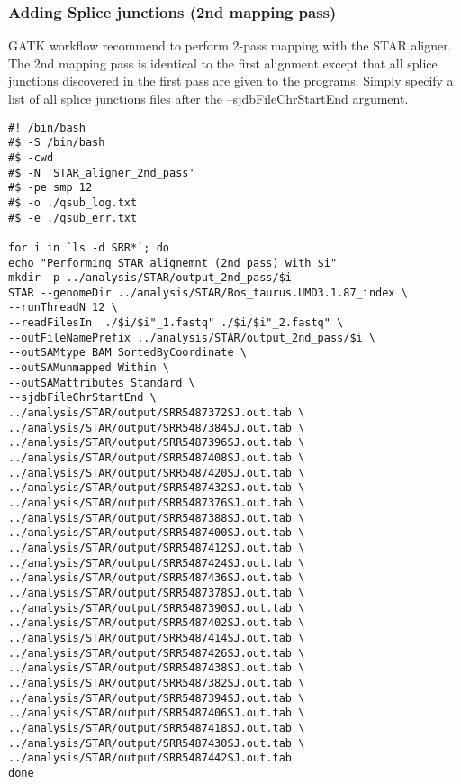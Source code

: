 \subsubsection{Adding Splice junctions (2nd mapping pass)}

GATK workflow recommend to perform 2-pass mapping with the STAR aligner. The 2nd mapping pass is identical to the first alignment except that all splice junctions discovered in the first pass are given to the programs. Simply specify a list of all splice junctions files after the --sjdbFileChrStartEnd argument.


\begin{verbatim}
#! /bin/bash
#$ -S /bin/bash
#$ -cwd
#$ -N 'STAR_aligner_2nd_pass'
#$ -pe smp 12
#$ -o ./qsub_log.txt
#$ -e ./qsub_err.txt

for i in `ls -d SRR*`; do	
echo "Performing STAR alignemnt (2nd pass) with $i"
mkdir -p ../analysis/STAR/output_2nd_pass/$i
STAR --genomeDir ../analysis/STAR/Bos_taurus.UMD3.1.87_index \
--runThreadN 12 \
--readFilesIn  ./$i/$i"_1.fastq" ./$i/$i"_2.fastq" \
--outFileNamePrefix ../analysis/STAR/output_2nd_pass/$i \
--outSAMtype BAM SortedByCoordinate \
--outSAMunmapped Within \
--outSAMattributes Standard \
--sjdbFileChrStartEnd \
../analysis/STAR/output/SRR5487372SJ.out.tab \
../analysis/STAR/output/SRR5487384SJ.out.tab \
../analysis/STAR/output/SRR5487396SJ.out.tab \
../analysis/STAR/output/SRR5487408SJ.out.tab \
../analysis/STAR/output/SRR5487420SJ.out.tab \
../analysis/STAR/output/SRR5487432SJ.out.tab \
../analysis/STAR/output/SRR5487376SJ.out.tab \
../analysis/STAR/output/SRR5487388SJ.out.tab \
../analysis/STAR/output/SRR5487400SJ.out.tab \
../analysis/STAR/output/SRR5487412SJ.out.tab \
../analysis/STAR/output/SRR5487424SJ.out.tab \
../analysis/STAR/output/SRR5487436SJ.out.tab \
../analysis/STAR/output/SRR5487378SJ.out.tab \
../analysis/STAR/output/SRR5487390SJ.out.tab \
../analysis/STAR/output/SRR5487402SJ.out.tab \
../analysis/STAR/output/SRR5487414SJ.out.tab \
../analysis/STAR/output/SRR5487426SJ.out.tab \
../analysis/STAR/output/SRR5487438SJ.out.tab \
../analysis/STAR/output/SRR5487382SJ.out.tab \
../analysis/STAR/output/SRR5487394SJ.out.tab \
../analysis/STAR/output/SRR5487406SJ.out.tab \
../analysis/STAR/output/SRR5487418SJ.out.tab \
../analysis/STAR/output/SRR5487430SJ.out.tab \
../analysis/STAR/output/SRR5487442SJ.out.tab
done

\end{verbatim}



